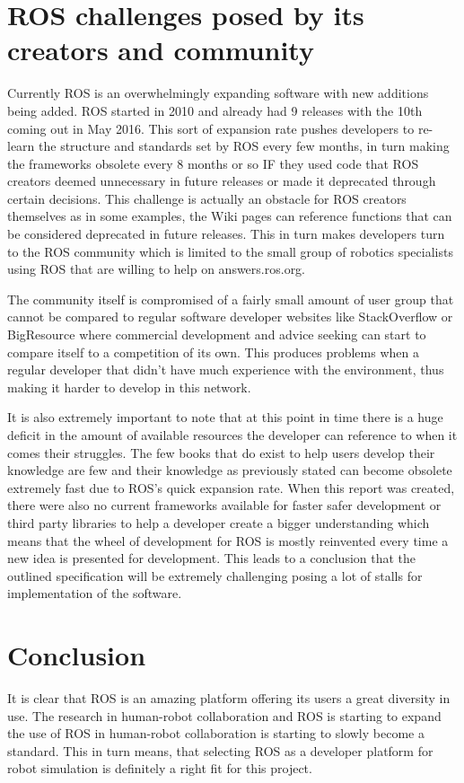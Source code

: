 \documentclass{report}
\begin{document}
      \section{ROS challenges posed by its creators and community}
        Currently ROS is an overwhelmingly expanding software with new additions being added. ROS started in 2010 and already had 9 releases with the 10th coming out in May 2016. This sort of expansion rate pushes developers to re-learn the structure and standards set by ROS every few months, in turn making the frameworks obsolete every 8 months or so IF they used code that ROS creators deemed unnecessary in future releases or made it deprecated through certain decisions. This challenge is actually an obstacle for ROS creators themselves as in some examples, the Wiki pages can reference functions that can be considered deprecated in future releases. This in turn makes developers turn to the ROS community which is limited to the small group of robotics specialists using ROS that are willing to help on answers.ros.org.

        The community itself is compromised of a fairly small amount of user group that cannot be compared to regular software developer websites like StackOverflow or BigResource where commercial development and advice seeking can start to compare itself to a competition of its own. This produces problems when a regular developer that didn't have much experience with the environment, thus making it harder to develop in this network.

        It is also extremely important to note that at this point in time there is a huge deficit in the amount of available resources the developer can reference to when it comes their struggles. The few books that do exist to help users develop their knowledge are few and their knowledge as previously stated can become obsolete extremely fast due to ROS's quick expansion rate. When this report was created, there were also no current frameworks available for faster safer development or third party libraries to help a developer create a bigger understanding which means that the wheel of development for ROS is mostly reinvented every time a new idea is presented for development. This leads to a conclusion that the outlined specification will be extremely challenging posing a lot of stalls for implementation of the software.
        
    \section{Conclusion}
      It is clear that ROS is an amazing platform offering its users a great diversity in use. The research in human-robot collaboration and ROS is starting to expand the use of ROS in human-robot collaboration is starting to slowly become a standard. This in turn means, that selecting ROS as a developer platform for robot simulation is definitely a right fit for this project.
\end{document}
